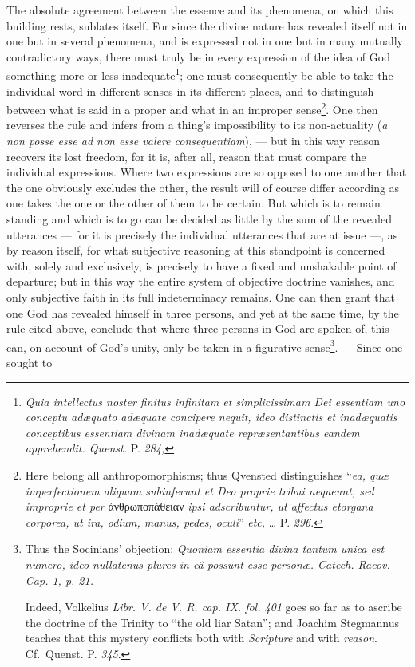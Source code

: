 \documentclass[12pt]{book}
\newcommand{\opage}[1]{\marginnote{\footnotesize\textit{[#1]}}}
\begin{document}
The absolute agreement between the essence and its phenomena, on which this
building rests, sublates itself.
\opage{83} \setcounter{footnote}{0}%
For since the divine nature has revealed itself not in one but in several
phenomena, and is expressed not in one but in many mutually contradictory
ways, there must truly be in every expression of the idea of God something
more or less inadequate\footnote{\textit{Quia intellectus noster finitus
infinitam et simplicissimam Dei essentiam uno conceptu adæquato adæquate
concipere nequit, ideo distinctis et inadæquatis conceptibus essentiam
divinam inadæquate repræsentantibus eandem apprehendit. Quenst.} P.
\textit{284,}}; one must consequently be able to take the individual word in
different senses in its different places, and to distinguish between what is
said in a proper and what in an improper sense\footnote{Here belong all
anthropomorphisms; thus Qvensted distinguishes ``\textit{ea, quæ
imperfectionem aliquam subinferunt et Deo proprie tribui nequeunt, sed
improprie et per} ἀνθρωποπάθειαν \textit{ipsi adscribuntur, ut affectus
etorgana corporea, ut ira, odium, manus, pedes, oculi}'' \textit{etc,} \ldots{}
P. \textit{296}.}. One then reverses the rule and infers from a thing's
impossibility to its non-actuality (\textit{a non posse esse ad non esse valere
consequentiam}), --- but in this way reason recovers its lost freedom, for it
is, after all, reason that must compare the individual expressions. Where two
expressions are so opposed to one another that the one obviously excludes the
other, the result will of course differ according as one takes the one or the
other of them to be certain. But which is to remain standing and which is to
go can be decided as little by the sum of the revealed utterances --- for it
is precisely the individual utterances that are at issue ---, as by reason
itself, for what subjective reasoning at this standpoint is concerned with,
solely and exclusively, is precisely to have a fixed and unshakable point of
departure; but in this way the entire system of objective doctrine vanishes,
and only subjective faith in its full indeterminacy remains.
\opage{84} \setcounter{footnote}{0}%
One can then grant that one God has revealed himself in three persons, and
yet at the same time, by the rule cited above, conclude that where three
persons in God are spoken of, this can, on account of God's unity, only be
taken in a figurative sense\footnote{Thus the Socinians' objection:
\textit{Quoniam essentia divina tantum unica est numero, ideo nullatenus
plures in eâ possunt esse personæ. Catech. Racov. Cap. 1, p. 21.}

Indeed, Volkelius \textit{Libr. V. de V. R. cap. IX. fol. 401} goes so far as
to ascribe the doctrine of the Trinity to ``the old liar Satan''; and Joachim
Stegmannus teaches that this mystery conflicts both with \emph{Scripture} and
with \emph{reason}. Cf.\ Quenst. P. \textit{345}.}. --- Since one sought to
\end{document}
